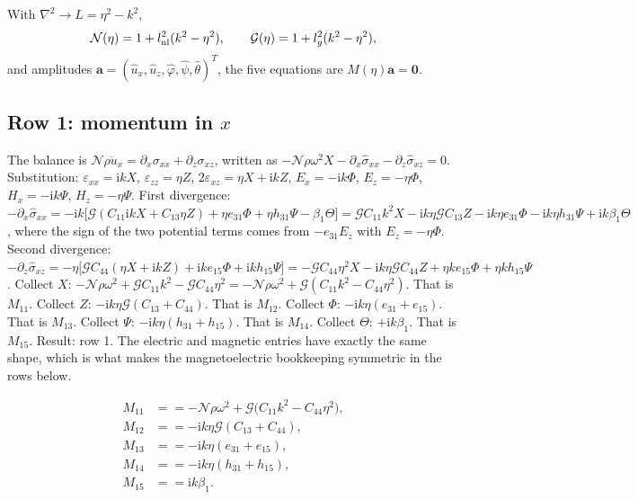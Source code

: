\documentclass[11pt]{article}
\makeatletter
\newif\ifshowworked
\newenvironment{worked}{%
  \ifshowworked\par\smallskip\noindent\textit{Working.}\par\smallskip\else
  \setbox\z@\vbox\bgroup\fi}{\ifshowworked\par\smallskip\else\egroup\fi}
\newcommand{\ii}{\mathrm{i}}
\newcommand{\Ncal}{\mathcal{N}}
\newcommand{\Gcal}{\mathcal{G}}
\makeatother
\begin{document}
With $\nabla^2\to L=\eta^2-k^2$,
\begin{equation}
\Ncal(\eta)=1+l_{\rm nl}^2(k^2-\eta^2),\qquad \Gcal(\eta)=1+l_g^2(k^2-\eta^2),
\end{equation}
and amplitudes $\mathbf a=(\hat u_x,\hat u_z,\hat\varphi,\hat\psi,\hat\theta)^T$, the five equations are
$M(\eta)\mathbf a=\mathbf 0$.

\subsection*{Row 1: momentum in $x$}

\begin{worked}
The balance is $\Ncal\rho\ddot u_x=\partial_x\sigma_{xx}+\partial_z\sigma_{xz}$, written as
$-\Ncal\rho\omega^2X-\partial_x\hat\sigma_{xx}-\partial_z\hat\sigma_{xz}=0$.
Substitution: $\varepsilon_{xx}=\ii kX$, $\varepsilon_{zz}=\eta Z$, $2\varepsilon_{xz}=\eta X+\ii kZ$,
$E_x=-\ii k\Phi$, $E_z=-\eta\Phi$, $H_x=-\ii k\Psi$, $H_z=-\eta\Psi$.
First divergence: $-\partial_x\hat\sigma_{xx}
=-\ii k\bigl[\Gcal(C_{11}\ii kX+C_{13}\eta Z)+\eta e_{31}\Phi+\eta h_{31}\Psi-\beta_1\Theta\bigr]
=\Gcal C_{11}k^2X-\ii k\eta\Gcal C_{13}Z-\ii k\eta e_{31}\Phi-\ii k\eta h_{31}\Psi+\ii k\beta_1\Theta$,
where the sign of the two potential terms comes from $-e_{31}E_z$ with $E_z=-\eta\Phi$.
Second divergence: $-\partial_z\hat\sigma_{xz}
=-\eta\bigl[\Gcal C_{44}(\eta X+\ii kZ)+\ii ke_{15}\Phi+\ii kh_{15}\Psi\bigr]
=-\Gcal C_{44}\eta^2X-\ii k\eta\Gcal C_{44}Z+\eta ke_{15}\Phi+\eta kh_{15}\Psi$.
Collect $X$: $-\Ncal\rho\omega^2+\Gcal C_{11}k^2-\Gcal C_{44}\eta^2
=-\Ncal\rho\omega^2+\Gcal(C_{11}k^2-C_{44}\eta^2)$. That is $M_{11}$.
Collect $Z$: $-\ii k\eta\Gcal(C_{13}+C_{44})$. That is $M_{12}$.
Collect $\Phi$: $-\ii k\eta(e_{31}+e_{15})$. That is $M_{13}$.
Collect $\Psi$: $-\ii k\eta(h_{31}+h_{15})$. That is $M_{14}$.
Collect $\Theta$: $+\ii k\beta_1$. That is $M_{15}$.
Result: row 1. The electric and magnetic entries have exactly the same shape, which is what makes the
magnetoelectric bookkeeping symmetric in the rows below.
\end{worked}

\begin{align}
M_{11}&==-\Ncal\rho\omega^2+\Gcal\bigl(C_{11}k^2-C_{44}\eta^2\bigr), \\
M_{12}&==-\ii k\eta\Gcal(C_{13}+C_{44}), \\
M_{13}&==-\ii k\eta(e_{31}+e_{15}), \\
M_{14}&==-\ii k\eta(h_{31}+h_{15}), \\
M_{15}&==\ii k\beta_1 .
\end{align}
\end{document}
